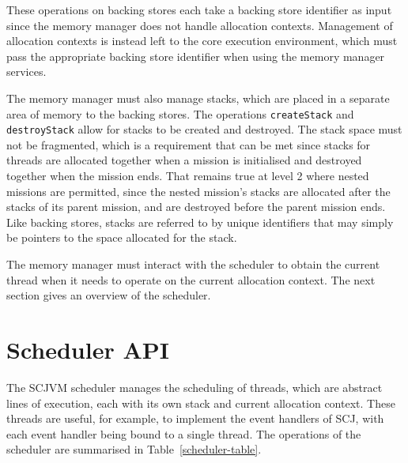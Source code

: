 These operations on backing stores each take a backing store
identifier as input since the memory manager does not handle
allocation contexts.
Management of allocation contexts is instead left to the core
execution environment, which must pass the appropriate backing store
identifier when using the memory manager services.

The memory manager must also manage stacks, which are placed in a
separate area of memory to the backing stores.
The operations \texttt{create\-Stack} and \texttt{destroy\-Stack}
allow for stacks to be created and destroyed.
The stack space must not be fragmented, which is a requirement that
can be met since stacks for threads are allocated together when a
mission is initialised and destroyed together when the mission ends.
That remains true at level 2 where nested missions are permitted,
since the nested mission's stacks are allocated after the stacks of
its parent mission, and are destroyed before the parent mission ends.
Like backing stores, stacks are referred to by unique identifiers that
may simply be pointers to the space allocated for the stack.

The memory manager must interact with the scheduler to obtain the
current thread when it needs to operate on the current allocation
context.
The next section gives an overview of the scheduler.

\section{Scheduler API}
\label{scheduler-section}

The SCJVM scheduler manages the scheduling of threads, which are
abstract lines of execution, each with its own stack and current
allocation context.
These threads are useful, for example, to implement the event handlers
of SCJ, with each event handler being bound to a single thread.
The operations of the scheduler are summarised in
Table~\ref{scheduler-table}.

